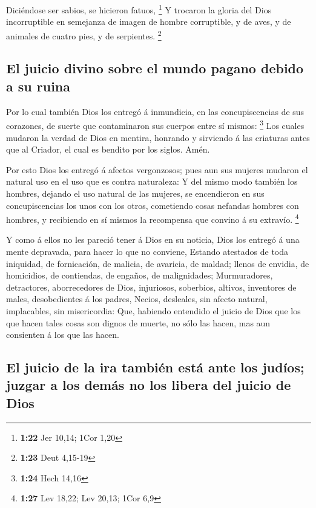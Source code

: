  Diciéndose ser sabios, se hicieron fatuos, \footnote{\textbf{1:22}
  Jer 10,14; 1Cor 1,20}  Y trocaron la gloria del Dios
incorruptible en semejanza de imagen de hombre corruptible, y de aves, y
de animales de cuatro pies, y de serpientes. \footnote{\textbf{1:23}
  Deut 4,15-19}

\hypertarget{el-juicio-divino-sobre-el-mundo-pagano-debido-a-su-ruina}{%
\subsection{El juicio divino sobre el mundo pagano debido a su
ruina}\label{el-juicio-divino-sobre-el-mundo-pagano-debido-a-su-ruina}}

 Por lo cual también Dios los entregó á inmundicia, en las
concupiscencias de sus corazones, de suerte que contaminaron sus cuerpos
entre sí mismos: \footnote{\textbf{1:24} Hech 14,16}  Los
cuales mudaron la verdad de Dios en mentira, honrando y sirviendo á las
criaturas antes que al Criador, el cual es bendito por los siglos. Amén.

 Por esto Dios los entregó á afectos vergonzosos; pues aun
sus mujeres mudaron el natural uso en el uso que es contra naturaleza:
 Y del mismo modo también los hombres, dejando el uso
natural de las mujeres, se encendieron en sus concupiscencias los unos
con los otros, cometiendo cosas nefandas hombres con hombres, y
recibiendo en sí mismos la recompensa que convino á su extravío.
\footnote{\textbf{1:27} Lev 18,22; Lev 20,13; 1Cor 6,9}

 Y como á ellos no les pareció tener á Dios en su noticia,
Dios los entregó á una mente depravada, para hacer lo que no conviene,
 Estando atestados de toda iniquidad, de fornicación, de
malicia, de avaricia, de maldad; llenos de envidia, de homicidios, de
contiendas, de engaños, de malignidades;  Murmuradores,
detractores, aborrecedores de Dios, injuriosos, soberbios, altivos,
inventores de males, desobedientes á los padres,  Necios,
desleales, sin afecto natural, implacables, sin misericordia:
 Que, habiendo entendido el juicio de Dios que los que
hacen tales cosas son dignos de muerte, no sólo las hacen, mas aun
consienten á los que las hacen.

\hypertarget{el-juicio-de-la-ira-tambiuxe9n-estuxe1-ante-los-juduxedos-juzgar-a-los-demuxe1s-no-los-libera-del-juicio-de-dios}{%
\subsection{El juicio de la ira también está ante los judíos; juzgar a
los demás no los libera del juicio de
Dios}\label{el-juicio-de-la-ira-tambiuxe9n-estuxe1-ante-los-juduxedos-juzgar-a-los-demuxe1s-no-los-libera-del-juicio-de-dios}}

